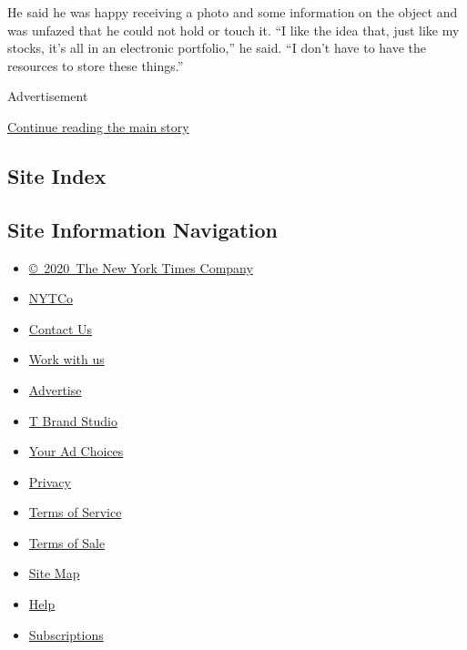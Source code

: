 He said he was happy receiving a photo and some information on the
object and was unfazed that he could not hold or touch it. ``I like the
idea that, just like my stocks, it's all in an electronic portfolio,''
he said. ``I don't have to have the resources to store these things.''

Advertisement

\protect\hyperlink{after-bottom}{Continue reading the main story}

\hypertarget{site-index}{%
\subsection{Site Index}\label{site-index}}

\hypertarget{site-information-navigation}{%
\subsection{Site Information
Navigation}\label{site-information-navigation}}

\begin{itemize}
\tightlist
\item
  \href{https://help.nytimes3xbfgragh.onion/hc/en-us/articles/115014792127-Copyright-notice}{©~2020~The
  New York Times Company}
\end{itemize}

\begin{itemize}
\tightlist
\item
  \href{https://www.nytco.com/}{NYTCo}
\item
  \href{https://help.nytimes3xbfgragh.onion/hc/en-us/articles/115015385887-Contact-Us}{Contact
  Us}
\item
  \href{https://www.nytco.com/careers/}{Work with us}
\item
  \href{https://nytmediakit.com/}{Advertise}
\item
  \href{http://www.tbrandstudio.com/}{T Brand Studio}
\item
  \href{https://www.nytimes3xbfgragh.onion/privacy/cookie-policy\#how-do-i-manage-trackers}{Your
  Ad Choices}
\item
  \href{https://www.nytimes3xbfgragh.onion/privacy}{Privacy}
\item
  \href{https://help.nytimes3xbfgragh.onion/hc/en-us/articles/115014893428-Terms-of-service}{Terms
  of Service}
\item
  \href{https://help.nytimes3xbfgragh.onion/hc/en-us/articles/115014893968-Terms-of-sale}{Terms
  of Sale}
\item
  \href{https://spiderbites.nytimes3xbfgragh.onion}{Site Map}
\item
  \href{https://help.nytimes3xbfgragh.onion/hc/en-us}{Help}
\item
  \href{https://www.nytimes3xbfgragh.onion/subscription?campaignId=37WXW}{Subscriptions}
\end{itemize}
